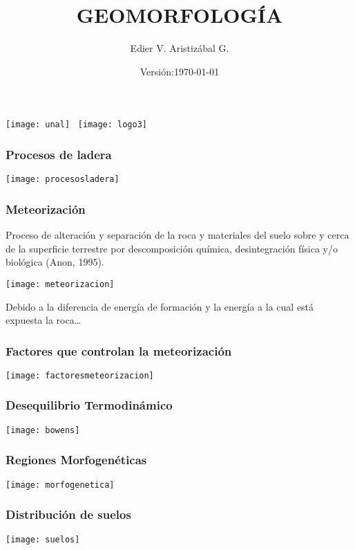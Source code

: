 \documentclass{beamer}
\title[Ambiente Denudacional: Meteorización]{GEOMORFOLOGÍA}
\author[Edier Aristizabal]{Edier V. Aristizábal G.}
\institute{evaristizabalg@unal.edu.co}
\date{Versión:\today}
\begin{document}
\begin{frame}
\titlepage
\centering
	\texttt{[image: unal]}\hspace*{4.75cm}~%
   	\texttt{[image: logo3]} 
\end{frame}
\begin{frame}
\frametitle{Procesos de ladera}
\centering
   	\texttt{[image: procesosladera]} 
\end{frame}
\begin{frame}
\frametitle{Meteorización}
\justifying
\small{Proceso de alteración y separación de la roca y materiales del suelo sobre y cerca de la superficie terrestre por descomposición química, desintegración física y/o biológica (Anon, 1995).}
\begin{center}
   	\texttt{[image: meteorizacion]}
\end{center}
\small{Debido a la diferencia de energía de formación y la energía a la cual está expuesta la roca…}
\end{frame}
\begin{frame}
\frametitle{Factores que controlan la meteorización}
\begin{center}
   	\texttt{[image: factoresmeteorizacion]}
\end{center}
\end{frame}
\begin{frame}
\frametitle{Desequilibrio Termodinámico}
\begin{center}
   	\texttt{[image: bowens]}
\end{center}
\end{frame}
\begin{frame}
\frametitle{Regiones Morfogenéticas}
\begin{center}
   	\texttt{[image: morfogenetica]}
\end{center}
\end{frame}
\begin{frame}
\frametitle{Distribución de suelos}
\begin{center}
   	\texttt{[image: suelos]}
\end{center}
\end{frame}
\end{document}
